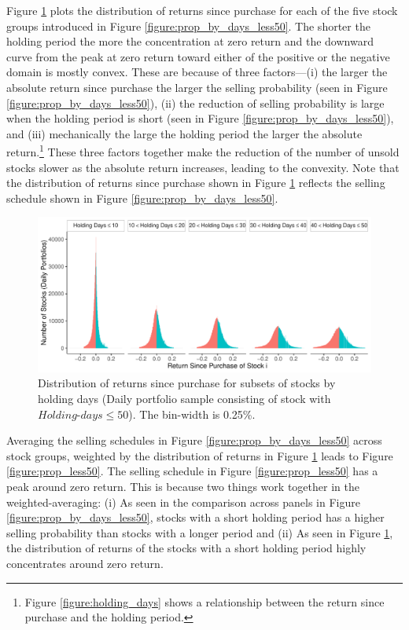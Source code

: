 \documentclass[11pt, a4paper]{article}
\begin{document}
Figure \ref{figure:dist_ret_by_days_less50} plots the distribution of returns since purchase for each of the five stock groups introduced in Figure \ref{figure:prop_by_days_less50}. The shorter the holding period the more the concentration at zero return and the downward curve from the peak at zero return toward either of the positive or the negative domain is mostly convex. These are because of three factors---(i) the larger the absolute return since purchase the larger the selling probability (seen in Figure \ref{figure:prop_by_days_less50}), (ii) the reduction of selling probability is large when the holding period is short (seen in Figure \ref{figure:prop_by_days_less50}), and (iii) mechanically the large the holding period the larger the absolute return.\footnote{Figure \ref{figure:holding_days} shows a relationship between the return since purchase and the holding period.} These three factors together make the reduction of the number of unsold stocks slower as the absolute return increases, leading to the convexity. Note that the distribution of returns since purchase shown in Figure \ref{figure:dist_ret_by_days_less50} reflects the selling schedule shown in Figure \ref{figure:prop_by_days_less50}. 

\begin{figure}[H]
	\centering
	\includegraphics[width=1\columnwidth]{barc_hist_return_daily_less50_NG_NL.pdf}
	\caption{\small Distribution of returns since purchase for subsets of stocks by holding days (Daily portfolio sample consisting of stock with $Holding\mbox{-}days\leq50$). The bin-width is 0.25\%.}
	\label{figure:dist_ret_by_days_less50}
\end{figure}


Averaging the selling schedules in Figure \ref{figure:prop_by_days_less50} across stock groups, weighted by the distribution of returns in Figure \ref{figure:dist_ret_by_days_less50} leads to Figure \ref{figure:prop_less50}. 
The selling schedule in Figure \ref{figure:prop_less50} has a peak around zero return. This is because two things work together in the weighted-averaging: (i) As seen in the comparison across panels in Figure \ref{figure:prop_by_days_less50}, stocks with a short holding period has a higher selling probability than stocks with a longer  period and (ii) As seen in Figure \ref{figure:dist_ret_by_days_less50}, the distribution of returns of the stocks with a short holding period highly concentrates around zero return. 
\end{document}
